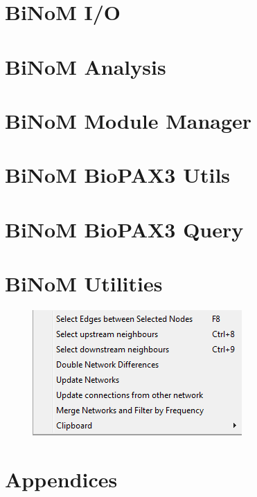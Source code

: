 \documentclass[11pt]{article}
\begin{document}
\section{BiNoM I/O}

\clearpage
\section{BiNoM Analysis}

\clearpage
\section{BiNoM Module Manager}

\clearpage
\section{BiNoM BioPAX3 Utils}

\clearpage
\section{BiNoM BioPAX3 Query}

\clearpage
\section{BiNoM Utilities}
\begin{figure}[h]
\includegraphics{graphics/_BiNoM_Utilities}
\end{figure}
\clearpage
\section{Appendices}

\clearpage
 
 
\end{document}

